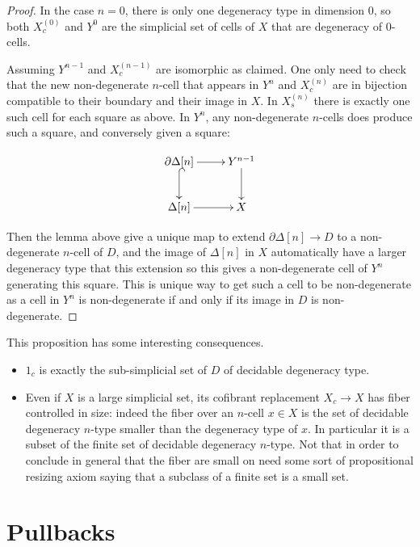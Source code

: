 \documentclass[reqno,10pt,a4paper,oneside,draft]{amsart}
\begin{document}
\begin{proof}
In the case $n=0$, there is only one degeneracy type in dimension $0$, so both $X^{(0)}_c$ and $Y^0$ are the simplicial set of cells of $X$ that are degeneracy of $0$-cells.

Assuming $Y^{n-1}$ and $X^{(n-1)}_c$ are isomorphic as claimed. One only need to check that the new non-degenerate $n$-cell that appears in $Y^{n}$ and $X^{(n)}_c$ are in bijection compatible to their boundary and their image in $X$.
In $X^{(n)}_s$ there is exactly one such cell for each square as above. In $Y^{n}$, any non-degenerate $n$-cells does produce such a square, and conversely given a square:

\[ \xymatrix{\partial \Delta[n]  \ar[r] \ar@{^{(}->}[d] & Y^{n-1} \ar[d] \\ \Delta[n]  \ar[r] & X} \]

Then the lemma above give a unique map to extend $\partial \Delta[n] \rightarrow D$ to a non-degenerate $n$-cell of $D$, and the image of $\Delta[n]$ in $X$ automatically have a larger degeneracy type that this extension so this gives a non-degenerate cell of $Y^{n}$ generating this square. This is unique way to get such a cell to be non-degenerate as a cell in $Y^n$ is non-degenerate if and only if its image in $D$ is non-degenerate.
\end{proof}


\begin{remark} 
This proposition has some interesting consequences.
\begin{itemize}
\item $1_c$ is exactly the sub-simplicial set of $D$ of decidable degeneracy type.
\item Even if $X$ is a large simplicial set, its cofibrant replacement $X_c \rightarrow X$ has fiber controlled in size: indeed the fiber over an $n$-cell $x \in X$ is the set of decidable degeneracy $n$-type smaller than the degeneracy type of $x$. In particular it is a subset of the finite set of decidable degeneracy $n$-type. Not that in order to conclude in general that the fiber are small on need some sort of propositional resizing axiom saying that a subclass of a finite set is a small set.
\end{itemize}
\end{remark}



 

\section{Pullbacks} 
\end{document}
